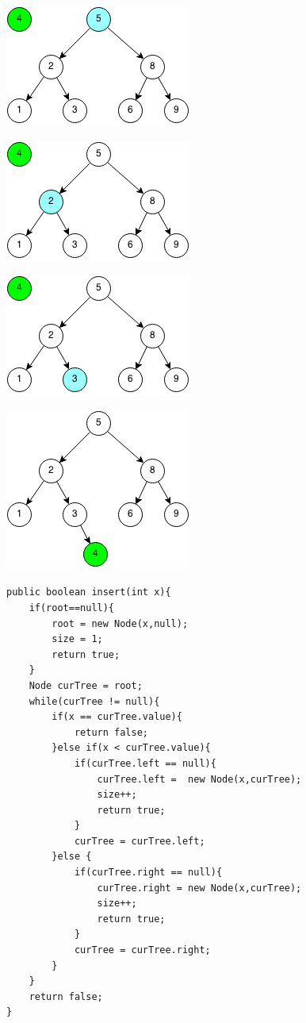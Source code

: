 \documentclass[11pt,oneside]{book}
\makeatletter
\def\maxwidth#1{\ifdim\Gin@nat@width>#1 #1\else\Gin@nat@width\fi}
\makeatother
\begin{document}
\vspace{5px}\includegraphics[width=\maxwidth{\textwidth}]{bstinsert.png}

\vspace{5px}\includegraphics[width=\maxwidth{\textwidth}]{bstinsert2.png}

\vspace{5px}\includegraphics[width=\maxwidth{\textwidth}]{bstinsert3.png}

\vspace{5px}\includegraphics[width=\maxwidth{\textwidth}]{bstinsert4.png}

\begin{lstlisting}
public boolean insert(int x){
    if(root==null){
        root = new Node(x,null);
        size = 1;
        return true;
    }
    Node curTree = root;
    while(curTree != null){
        if(x == curTree.value){
            return false;
        }else if(x < curTree.value){
            if(curTree.left == null){
                curTree.left =  new Node(x,curTree);
                size++;
                return true;
            }
            curTree = curTree.left;
        }else {
            if(curTree.right == null){
                curTree.right = new Node(x,curTree);
                size++;
                return true;
            }
            curTree = curTree.right;
        }
    }
    return false;
}
\end{lstlisting}
\end{document}
